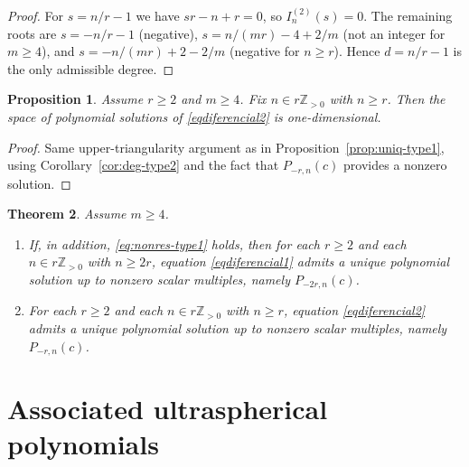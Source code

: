 \documentclass[final,nopreprintline]{elsarticle}
\newtheorem{theorem}{Theorem}[section]
\newtheorem{proposition}[theorem]{Proposition}
\theoremstyle{definition}
\numberwithin{equation}{section}
\theoremstyle{remark}
\begin{document}
\begin{proof}
For $s=n/r-1$ we have $sr-n+r=0$, so $I^{(2)}_n(s)=0$.
The remaining roots are $s=-n/r-1$ (negative), $s=n/(mr)-4+2/m$ (not an integer for
$m\ge4$), and $s=-n/(mr)+2-2/m$ (negative for $n\ge r$). Hence $d=n/r-1$ is the only
admissible degree.
\end{proof}

\begin{proposition}\label{prop:uniq-type2}
Assume $r\ge2$ and $m\ge4$.
Fix $n\in r\mathbb{Z}_{>0}$ with $n\ge r$.
Then the space of polynomial solutions of \eqref{eqdiferencial2} is one-dimensional.
\end{proposition}

\begin{proof}
Same upper-triangularity argument as in Proposition~\ref{prop:uniq-type1}, using
Corollary~\ref{cor:deg-type2} and the fact that $P_{-r,n}(c)$ provides a nonzero solution.
\end{proof}

\begin{theorem}\label{thm:uniqueness-main}
Assume $m\ge4$.
\begin{enumerate}[\rm(i)]
\item If, in addition, \eqref{eq:nonres-type1} holds, then for each $r\ge2$ and each
    $n\in r\mathbb{Z}_{>0}$ with $n\ge2r$, equation \eqref{eqdiferencial1} admits a unique
    polynomial solution up to nonzero scalar multiples, namely $P_{-2r,n}(c)$.
\item For each $r\ge2$ and each $n\in r\mathbb{Z}_{>0}$ with $n\ge r$, equation
    \eqref{eqdiferencial2} admits a unique polynomial solution up to nonzero scalar
    multiples, namely $P_{-r,n}(c)$.
\end{enumerate}
\end{theorem}

\section{Associated ultraspherical polynomials}\label{subsec:assoc-ultra}
\end{document}
